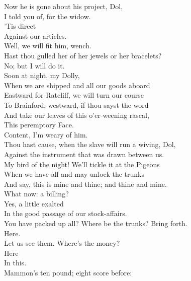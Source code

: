 \documentclass[a4paper,oneside,12pt]{memoir}
\begin{document}
\begin{drama*}
\subtlespeaks Now he is gone about his project, Dol,\\
I told you of, for the widow.\\
\dolspeaks {} 'Tis direct\\
Against our articles.\\
\subtlespeaks {} Well, we will fit him, wench.\\
Hast thou gulled her of her jewels or her bracelets?\\
\dolspeaks No; but I will do it.\\
\subtlespeaks {} Soon at night, my Dolly,\\
When we are shipped and all our goods aboard\\
Eastward for Ratcliff, we will turn our course\\
To Brainford, westward, if thou sayst the word\\
And take our leaves of this o'er-weening rascal,\\
This peremptory Face.\\
\dolspeaks {} Content, I'm weary of him.\\
\subtlespeaks Thou hast cause, when the slave will run a wiving, Dol,\\
Against the instrument that was drawn between us.\\
My bird of the night! We'll tickle it at the Pigeons\\
When we have all and may unlock the trunks\\
And say, this is mine and thine; and thine and mine.\\
\facespeaks What now: a billing?\\
\subtlespeaks {} Yes, a little exalted\\
In the good passage of our stock-affairs.\\
\facespeaks You have packed up all? Where be the trunks? Bring forth.\\
\subtlespeaks Here.\\
\facespeaks {} Let us see them. Where's the money?\\
\subtlespeaks {} Here\\
In this.\\
\facespeaks {} Mammon's ten pound; eight score before:\\

\end{drama*}
\end{document}
